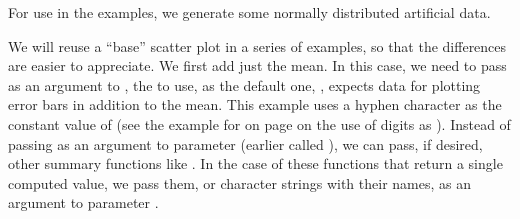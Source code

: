 \documentclass[krantz2]{krantz}\usepackage{knitr}
\begin{document}
For use in the examples, we generate some normally distributed artificial data.

\begin{knitrout}\footnotesize
{}\color{fgcolor}\begin{kframe}
\begin{alltt}
 \hlkwb{<-} \hlstd{(}
   \hlstd{=} \hlstd{(}\hlstd{(}\hlstd{,}  \hlstd{=} \hlstd{,}  \hlstd{=} \hlstd{),}
        \hlstd{(}\hlstd{,}  \hlstd{=} \hlstd{,}  \hlstd{=} \hlstd{)),}
   \hlstd{=} \hlstd{(}\hlstd{(}\hlstd{(}\hlstd{,} \hlstd{),} \hlstd{(}\hlstd{,} \hlstd{)))}
  \hlstd{)}
\end{alltt}
\end{kframe}
\end{knitrout}

We will reuse a ``base'' scatter plot in a series of examples, so that the differences are easier to appreciate. We first add just the mean. In this case, we need to pass as an argument to , the  to use, as the default one, , expects data for plotting error bars in addition to the mean. This example uses a hyphen character as the constant value of  (see the example for  on page \pageref{chunk:plot:point:char} on the use of digits as ). Instead of passing  as an argument to parameter  (earlier called ), we can pass, if desired, other summary functions like . In the case of these functions that return a single computed value, we pass them, or character strings with their names, as an argument to parameter .
\end{document}
